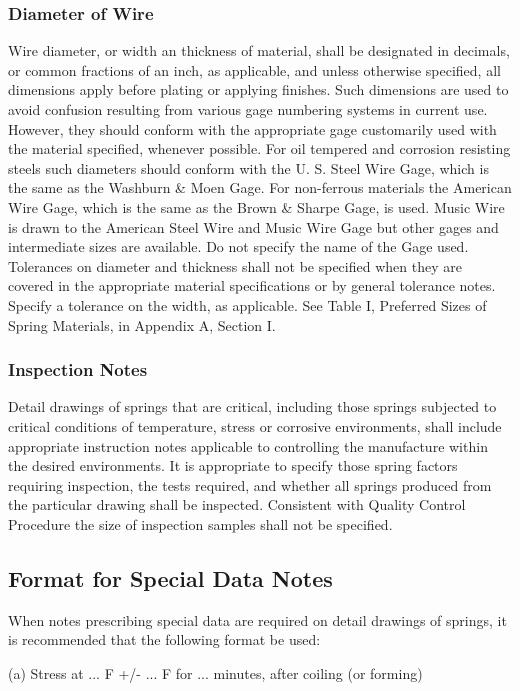 \documentclass[10pt]{article}
\begin{document}
\subsubsection{Diameter of Wire}
Wire diameter, or width an thickness of material, shall be designated in decimals, or common fractions of an inch, as applicable, and unless otherwise specified, all dimensions apply before plating or applying finishes. 
Such dimensions are used to avoid confusion resulting from various gage numbering systems in current use. 
However, they should conform with the appropriate gage customarily used with the material specified, whenever possible. 
For oil tempered and corrosion resisting steels such diameters should conform with the U. S. Steel Wire Gage, which is the same as the Washburn \& Moen Gage. 
For non-ferrous materials the American Wire Gage, which is the same as the Brown \& Sharpe Gage, is used. 
Music Wire is drawn to the American Steel Wire and Music Wire Gage but other gages and intermediate sizes are available. 
Do not specify the name of the Gage used. 
Tolerances on diameter and thickness shall not be specified when they are covered in the appropriate material specifications or by general tolerance notes.
Specify a tolerance on the width, as applicable. 
See Table I, Preferred Sizes of Spring Materials, in Appendix A, Section I.

\subsubsection{Inspection Notes}
Detail drawings of springs that are critical, including those
springs subjected to critical conditions of temperature, stress or corrosive environments, shall include appropriate instruction
notes applicable to controlling the manufacture within the desired environments. 
It is appropriate to specify those spring factors requiring inspection, the tests required, and whether all springs produced from the particular drawing shall be inspected. 
Consistent with Quality Control Procedure the size of inspection samples shall not be specified.

\subsection{Format for Special Data Notes}
When notes prescribing special data are required on detail drawings of springs, it is recommended that the following format be used:

(a) Stress at ... F +/- ... F for ... minutes, after coiling (or forming)
\end{document}
